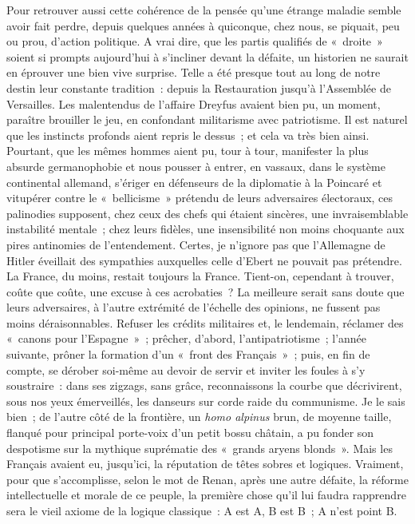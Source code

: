 \documentclass[french,twoside]{book} %
\begin{document}
Pour retrouver aussi cette cohérence de la pensée qu’une étrange maladie semble avoir fait perdre, depuis quelques années à quiconque, chez nous, se piquait, peu ou prou, d’action politique. A vrai dire, que les partis qualifiés de « droite » soient si prompts aujourd’hui à s’incliner devant la défaite, un historien ne saurait en éprouver une bien vive surprise. Telle a été presque tout au long de notre destin leur constante tradition : depuis la Restauration jusqu’à l’Assemblée de Versailles. Les malentendus de l’affaire Dreyfus avaient bien pu, un moment, paraître brouiller le jeu, en confondant militarisme avec patriotisme. Il est naturel que les instincts profonds aient repris le dessus ; et cela va très bien ainsi. Pourtant, que les mêmes hommes aient pu, tour à tour, manifester la plus absurde germanophobie et nous pousser à entrer, en vassaux, dans le système continental allemand, s’ériger en défenseurs de la diplomatie à la Poincaré et vitupérer contre le « bellicisme » prétendu de leurs adversaires électoraux, ces palinodies supposent, chez ceux des chefs qui étaient sincères, une invraisemblable instabilité mentale ; chez leurs fidèles, une insensibilité non moins choquante aux pires antinomies de l’entendement. Certes, je n’ignore pas que l’Allemagne de Hitler éveillait des sympathies auxquelles celle d’Ebert ne pouvait pas prétendre. La France, du moins, restait toujours la France. Tient-on, cependant à trouver, coûte que coûte, une excuse à ces acrobaties ? La meilleure serait sans doute que leurs adversaires, à l’autre extrémité de l’échelle des opinions, ne fussent pas moins déraisonnables. Refuser les crédits militaires et, le lendemain, réclamer des « canons pour l’Espagne » ; prêcher, d’abord,   l’antipatriotisme ; l’année suivante, prôner la formation d’un « front des Français » ; puis, en fin de compte, se dérober soi-même au devoir de servir et inviter les foules à s’y soustraire : dans ses zigzags, sans grâce, reconnaissons la courbe que décrivirent, sous nos yeux émerveillés, les danseurs sur corde raide du communisme. Je le sais bien ; de l’autre côté de la frontière, un \emph{homo alpinus} brun, de moyenne taille, flanqué pour principal porte-voix d’un petit bossu châtain, a pu fonder son despotisme sur la mythique suprématie des « grands aryens blonds ». Mais les Français avaient eu, jusqu’ici, la réputation de têtes sobres et logiques. Vraiment, pour que s’accomplisse, selon le mot de Renan, après une autre défaite, la réforme intellectuelle et morale de ce peuple, la première chose qu’il lui faudra rapprendre sera le vieil axiome de la logique classique : A est A, B est B ; A n’est point B.\par
\end{document}

